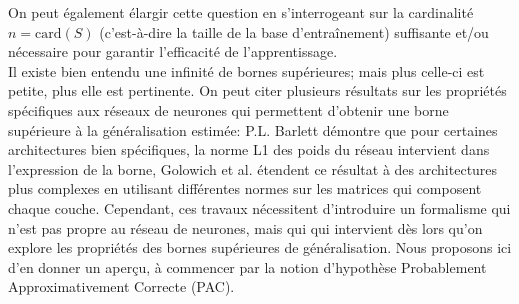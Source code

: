 On peut également élargir cette question en s'interrogeant sur la cardinalité $n=\text{card}(S)$ (c'est-à-dire la taille de la base d'entraînement) suffisante et/ou nécessaire pour garantir l'efficacité de l'apprentissage. \\
Il existe bien entendu une infinité de bornes supérieures; mais plus celle-ci est petite, plus elle est pertinente. On peut citer plusieurs résultats sur les propriétés spécifiques aux réseaux de neurones qui permettent d'obtenir une borne supérieure à la généralisation estimée: P.L. Barlett \cite{bartlettSampleComplexityPattern1998} démontre que pour certaines architectures bien spécifiques, la norme L1 des poids du réseau intervient dans l'expression de la borne, Golowich et al. \cite{pmlr-v75-golowich18a} étendent ce résultat à des architectures plus complexes en utilisant différentes normes sur les matrices qui composent chaque couche.
Cependant, ces travaux nécessitent d'introduire un formalisme qui n'est pas propre au réseau de neurones, mais qui qui intervient dès lors qu'on explore les propriétés des bornes supérieures de généralisation. Nous proposons ici d'en donner un aperçu, à commencer par la notion d'hypothèse \og Probablement Approximativement Correcte \fg (PAC).

